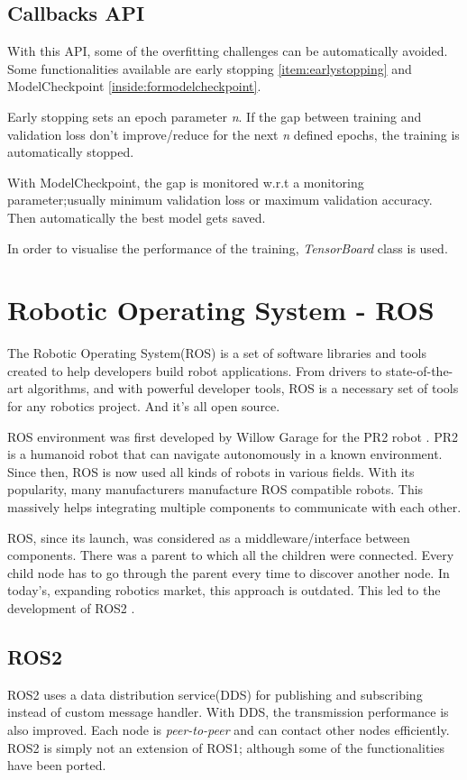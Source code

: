 \subsection{Callbacks API}
With this API, some of the overfitting challenges can be automatically avoided.
Some functionalities available are early stopping \ref{item:earlystopping} and ModelCheckpoint \ref{inside:formodelcheckpoint}.

Early stopping sets an epoch parameter \textit{n}. If the gap between training and validation loss
don't improve/reduce for the next \textit{n} defined epochs, the training is automatically
stopped.

With ModelCheckpoint, the gap is monitored w.r.t a monitoring parameter;usually minimum validation
loss or maximum validation accuracy. Then automatically the best model gets saved.

In order to visualise the performance of the training, \textit{TensorBoard} class is used.

\section{Robotic Operating System - ROS}
The Robotic Operating System(ROS) \cite{aboutros} is a set of software libraries and tools created to help
developers build robot applications. From drivers to state-of-the-art algorithms, and with powerful developer tools, ROS is a necessary set of tools for any robotics project. And it’s all open source.

ROS environment was first developed by Willow Garage for the PR2 robot \cite{firstros}. PR2 is a humanoid robot that can navigate autonomously in a known environment.
Since then, ROS is now used all kinds of robots in various fields. With its popularity,
many manufacturers manufacture ROS compatible robots. This massively helps integrating
multiple components to communicate with each other.

ROS, since its launch, was considered as a middleware/interface between components. There was a
parent to which all the children were connected. Every child node has to go through the
parent every time to discover another node.  In today's, expanding robotics market,
this approach is outdated. This led to the development of ROS2 \cite{whyros2}.
\subsection{ROS2}
ROS2 uses a data distribution service(DDS) for publishing and subscribing instead of
custom message handler. With DDS, the transmission performance is also improved. Each node
is \textit{peer-to-peer} and can contact other nodes efficiently.
ROS2 is simply not an extension of ROS1; although some of the functionalities have been
ported.


